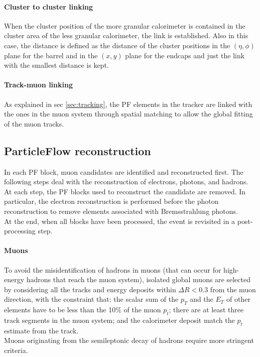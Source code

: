 \paragraph*{Cluster to cluster linking}
When the cluster position of the more granular calorimeter is contained in the cluster area of the less granular calorimeter, the link is established.
Also in this case, the distance is defined as the distance of the cluster positions in the $(\eta,\phi)$ plane for the barrel and in the $(x,y)$ plane for the endcaps and just the link with the smallest distance is kept.

\paragraph*{Track-muon linking}
As explained in sec \ref{sec:tracking}, the PF elements in the tracker are linked with the ones in the muon system through spatial matching to allow the global fitting of the muon tracks.



\subsection{ParticleFlow reconstruction}
In each PF block, muon candidates are identified and reconstructed first. The following steps deal with the reconstruction of electrons, photons, and hadrons.
At each step, the PF blocks used to reconstruct the candidate are removed. In particular, the electron reconstruction is performed before the photon reconstruction to remove elements associated with Bremsstrahlung photons.\\
At the end, when all blocks have been processed, the event is revisited in a post-processing step.

\paragraph*{Muons}
To avoid the misidentification of hadrons in muons (that can occur for high-energy hadrons that reach the muon system), isolated global muons are selected by considering all the tracks and energy deposits within $\Delta R<0.3$ from the muon direction, with the constraint that: the scalar sum of the $p_T$ and the $E_T$ of other elements have to be less than the 10\% of the muon $p_t$; there are at least three track segments in the muon system; and the calorimeter deposit match the $p_t$ estimate from the track.\\
Muons originating from the semileptonic decay of hadrons require more stringent criteria.

